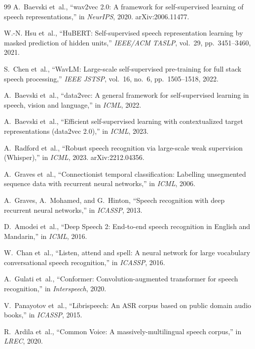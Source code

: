 \begin{thebibliography}{99}
A.~Baevski et~al., ``wav2vec 2.0: A framework for self-supervised learning of
speech representations,'' in \emph{NeurIPS}, 2020. arXiv:2006.11477.

W.-N. Hsu et~al., ``HuBERT: Self-supervised speech representation learning by
masked prediction of hidden units,'' \emph{IEEE/ACM TASLP}, vol.~29,
pp.~3451--3460, 2021.

S.~Chen et~al., ``WavLM: Large-scale self-supervised pre-training for full stack
speech processing,'' \emph{IEEE JSTSP}, vol.~16, no.~6, pp.~1505--1518, 2022.

A.~Baevski et~al., ``data2vec: A general framework for self-supervised learning
in speech, vision and language,'' in \emph{ICML}, 2022.

A.~Baevski et~al., ``Efficient self-supervised learning with contextualized
target representations (data2vec 2.0),'' in \emph{ICML}, 2023.

A.~Radford et~al., ``Robust speech recognition via large-scale weak supervision
(Whisper),'' in \emph{ICML}, 2023. arXiv:2212.04356.

A.~Graves et~al., ``Connectionist temporal classification: Labelling unsegmented
sequence data with recurrent neural networks,'' in \emph{ICML}, 2006.

A.~Graves, A.~Mohamed, and G.~Hinton, ``Speech recognition with deep recurrent
neural networks,'' in \emph{ICASSP}, 2013.

D.~Amodei et~al., ``Deep Speech 2: End-to-end speech recognition in English and
Mandarin,'' in \emph{ICML}, 2016.

W.~Chan et~al., ``Listen, attend and spell: A neural network for large vocabulary
conversational speech recognition,'' in \emph{ICASSP}, 2016.

A.~Gulati et~al., ``Conformer: Convolution-augmented transformer for speech
recognition,'' in \emph{Interspeech}, 2020.

V.~Panayotov et~al., ``Librispeech: An ASR corpus based on public domain audio
books,'' in \emph{ICASSP}, 2015.

R.~Ardila et~al., ``Common Voice: A massively-multilingual speech corpus,'' in
\emph{LREC}, 2020.


\end{thebibliography}
